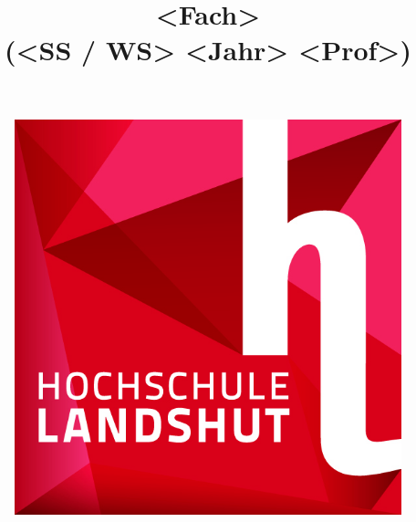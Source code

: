 \documentclass{report}
\title{<Fach>\\(<SS / WS> <Jahr> <Prof>)}
\begin{document}
\begin{figure}
	\begin{center}
  		\includegraphics[]{Resources/haw.png}
	\end{center}
\end{figure}
\maketitle
\tableofcontents

\newpage


\end{document}
